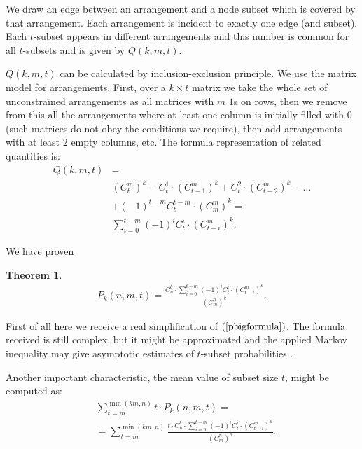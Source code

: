 \documentclass[conference]{IEEEtran}
\newtheorem{theorem}	{Theorem}
\begin{document}
We draw an edge between an arrangement and a node subset which is covered by that arrangement. Each arrangement is incident to exactly one edge (and subset). Each $t$-subset appears in different arrangements and this number is common for all  $t$-subsets and is given by $Q(k,m,t)$.


$Q(k,m,t)$ can be calculated by inclusion-exclusion principle. We use the matrix model for arrangements. First, over a $k \times t$ matrix we take the whole set of unconstrained arrangements as all matrices with $m$ $1$s on rows, then we remove from this all the arrangements where at least one column is initially filled with $0$ (such matrices do not obey the conditions we require), then add arrangements with at least $2$ empty columns, etc. The formula representation of related quantities is:
\begin{align}
Q(k,m,t) & = \nonumber \\ 
& \left(C_{t}^{m}\right)^{k}-C_{t}^{1} \cdot \left(C_{t-1}^{m}\right)^{k}+C_{t}^{2} \cdot \left(C_{t-2}^{m}\right)^{k}-\ldots \nonumber \\ &+\left(-1\right)^{t-m}C_{t}^{t-m} \cdot \left(C_{m}^{m}\right)^{k}= \nonumber \\ 
& \sum_{i=0}^{t-m}\left(-1\right)^{i}C_{t}^{i} \cdot \left(C_{t-i}^{m}\right)^{k}. \label{inclexcl}
\end{align}

We have proven
\begin{theorem}
\begin{align}
	P_{k}(n,m,t)=\frac{C_{n}^{t} \cdot \sum_{i=0}^{t-m}\left(-1\right)^{i}C_{t}^{i} \cdot \left(C_{t-i}^{m}\right)^{k}}{\left(C_{m}^{n}\right)^{k}}. \label{pformula}
\end{align}
\end{theorem}

First of all here we receive a real simplification of $(\ref{pbigformula})$. The formula received is still complex, but it might be approximated and the applied Markov inequality may give asymptotic estimates of  $t$-subset probabilities \cite{medvedev}.

 
Another important characteristic, the mean value of subset size $t$, might be computed as:
\begin{align}
	&\sum_{t=m}^{\min(km,n)}t \cdot P_{k}(n,m,t)= \nonumber \\
	&=\sum_{t=m}^{\min(km,n)}\frac{t \cdot C_{n}^{t} \cdot \sum_{i=0}^{t-m}\left(-1\right)^{i}C_{t}^{i} \cdot \left(C_{t-i}^{m}\right)^{k}}{\left(C_{m}^{n}\right)^{k}}. \label{meanformula}
\end{align}
\end{document}
